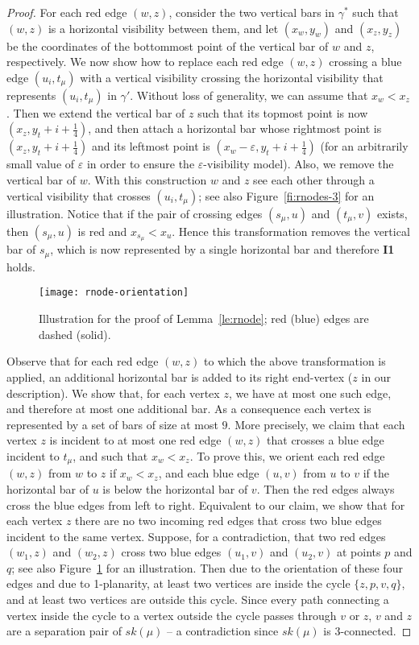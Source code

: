 \documentclass{article}
\begin{document}
\begin{proof}
For each red edge $(w,z)$, consider the two vertical bars in $\gamma^*$ such that $(w,z)$ is a horizontal visibility between them, and let $(x_w,y_w)$ and $(x_z,y_z)$ be the coordinates of the bottommost point of the vertical bar of $w$ and $z$, respectively. We now show how to replace each red edge $(w,z)$ crossing a blue edge $(u_i,t_\mu)$ with a vertical visibility crossing the horizontal visibility that represents $(u_i,t_\mu)$ in $\gamma'$. Without loss of generality, we can assume that $x_w < x_z$. Then we extend the vertical bar of $z$ such that its topmost point is now $(x_z,y_t+i+\frac{1}{4})$, and then attach a horizontal bar whose rightmost point is $(x_z,y_t+i+\frac{1}{4})$ and its leftmost point is $(x_w-\varepsilon,y_t+i+\frac{1}{4})$ (for an arbitrarily small value of $\varepsilon$ in order to ensure the $\varepsilon$-visibility model). Also, we remove the vertical bar of $w$. With this construction  $w$ and $z$ see each other through a vertical visibility that crosses $(u_i,t_\mu)$; see also Figure~\ref{fi:rnodes-3} for an illustration. Notice that if the pair of crossing edges  $(s_\mu,u)$ and $(t_\mu,v)$ exists, then $(s_\mu,u)$ is red and $x_{s_\mu} < x_u$. Hence this transformation removes the vertical bar of $s_\mu$, which is now represented by a single horizontal bar and therefore {\bf I1} holds.


\begin{figure}[t]
    \centering
    \texttt{[image: rnode-orientation]}
    \caption{Illustration for the proof of Lemma~\ref{le:rnode}; red (blue) edges are dashed (solid).\label{fi:rnode-orientation}}
\end{figure}


Observe that for each red edge $(w,z)$ to which the above transformation is applied, an additional horizontal bar is added to its right end-vertex ($z$ in our description). We show that, for each vertex $z$, we have at most one such edge, and therefore at most one additional bar.  As a consequence each vertex  is represented by a set of bars of size at most $9$. More precisely, we claim that each vertex $z$ is incident to at most one red edge $(w,z)$ that crosses a blue edge incident to $t_\mu$, and such that $x_w < x_z$. To prove this, we orient each red edge $(w,z)$ from $w$ to $z$ if $x_w < x_z$, and each blue edge $(u,v)$ from $u$ to $v$ if the horizontal bar of $u$ is below the horizontal bar of $v$. Then the red edges always cross the blue edges from left to right. Equivalent to our claim, we show that for each vertex $z$ there are no two incoming red edges that cross two blue edges incident to the same vertex. Suppose, for a contradiction, that two red edges $(w_1,z)$ and $(w_2,z)$ cross two blue edges $(u_1,v)$ and $(u_2,v)$ at points $p$ and $q$; see also Figure~\ref{fi:rnode-orientation} for an illustration.  Then due to the orientation of these four edges and due to 1-planarity, at least two vertices are inside the cycle $\{z,p,v,q\}$, and at least two vertices are outside this cycle. Since every path connecting a vertex inside the cycle to a vertex outside the cycle passes through $v$ or $z$, $v$ and $z$ are a separation pair of $sk(\mu)$ --  a contradiction since $sk(\mu)$ is 3-connected.


\end{proof}
\end{document}
